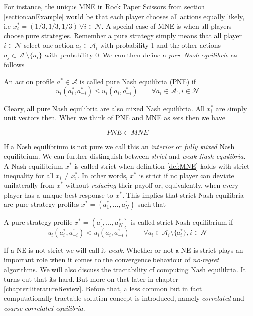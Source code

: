 For instance, the unique MNE in Rock Paper Scissors from section \ref{section:anExample} would be that each player chooses all actions equally likely, i.e $x_{i}^{*} = (1/3,1/3,1/3) \ \forall i \in \mathcal{N}$. A special case of MNE is when all players choose pure strategies. Remember a pure strategy simply means that all player $i \in \mathcal{N}$ select one action $a_i \in \mathcal{A}_i$ with probability 1 and the other actions $a_j \in \mathcal{A}_i \setminus \{a_i\}$ with probability 0. We can then define a \textit{pure Nash equilibria} as follows.

\begin{definition}\label{def:PNE}
    An action profile $a^* \in \mathcal{A}$ is called pure Nash equilibria (PNE) if
    \[u_i(a_{i}^{*},a_{-i}^{*}) \le u_i(a_{i},a_{-i}^{*}) \qquad \forall a_i \in \mathcal{A}_i, i \in \mathcal{N}\]
\end{definition}

Cleary, all pure Nash equilibria are also mixed Nash equilibria. All $x_{i}^{*}$ are simply unit vectors then. When we think of PNE and MNE as sets then we have 

\begin{equation*}
    PNE \subset MNE
\end{equation*}

If a Nash equilibrium is not pure we call this an \textit{interior} or \textit{fully mixed} Nash equilibrium. We can further distinguish between \textit{strict} and \textit{weak Nash equilibria}. A Nash equilibrium $x^*$ is called strict when definition \ref{def:MNE} holds with strict inequality for all $x_i \neq x_{i}^{*}$. In other words, $x^*$ is strict if no player can deviate unilaterally from $x^*$ without \textit{reducing} their payoff or, equivalently, when every player has a unique best response to $x^*$. This implies that strict Nash equilibria are pure strategy profiles $x^* = (a_{1}^{*},\dots,a_{N}^{*})$ such that

\begin{definition}\label{def:strictNE}
    A pure strategy profile $x^* = (a_{1}^{*},\dots,a_{N}^{*})$ is called strict Nash equilibrium if
    \[u_i(a_{i}^{*},a_{-i}^{*}) < u_i(a_{i},a_{-i}^{*}) \qquad \forall a_i \in \mathcal{A}_i \setminus \{a_{i}^{*}\} , i \in \mathcal{N}\]
\end{definition}

If a NE is not strict we will call it \textit{weak}. Whether or not a NE is strict plays an important role when it comes to the convergence behaviour of \textit{no-regret} algorithms. We will also discuss the tractability of computing Nash equilibria. It turns out that its hard. But more on that later in chapter \ref{chapter:literatureReview}. Before that, a less common but in fact computationally tractable solution concept is introduced, namely \textit{correlated} and \textit{coarse correlated equilibria}.\\

